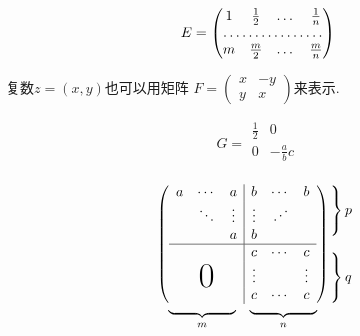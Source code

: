\documentclass{ctexart}
\begin{document}
	\[
	E = \begin{pmatrix}
		1 & \frac 12 & \dots & \frac 1n\\
		\hdotsfor{4}\\
		m & \frac m2 & \dots & \frac mn
	\end{pmatrix}
	\]
	
	复数$z = (x,y)$也可以用矩阵
	\begin{math}
		F = \left(%
		\begin{smallmatrix}
			x & -y \\ y & x
		\end{smallmatrix}
		\right)%
	\end{math}来表示.

	\[
	G = \begin{array}{r|r}
		\frac{1}{2} & 0\\
		\hline
		0			& -\frac abc\\
	\end{array}
	\]
	
	\[
	\begin{array}{c@{\hspace{-5pt}} l}
		\left(
		\begin{array}{ccc|ccc}
			a & \cdots & a 		& b 	 & \cdots & b\\
			  & \ddots & \vdots & \vdots & \iddots	 \\%
			  &		   & a		& b 				 \\
			  \hline
			  &		   &		& c		 & \cdots & c \\
			  &		   &		& \vdots & 		  & \vdots \\
			\multicolumn{3}{c|}{\raisebox{2ex}[0pt]{\Huge 0}}
			  & c	   & \cdots & c
		\end{array}
		\right)
		&
		\begin{array}{l}
			\left.\rule{0mm}{7mm}\right\}p\\
			\\
			\left.\rule{0mm}{7mm}\right\}q
		\end{array}
		\\[-5pt]
		\begin{array}{cc}
			\underbrace{\rule{17mm}{0mm}}_m &
			\underbrace{\rule{17mm}{0mm}}_n
		\end{array}
		& %
	\end{array}
	\]
	
\end{document}
